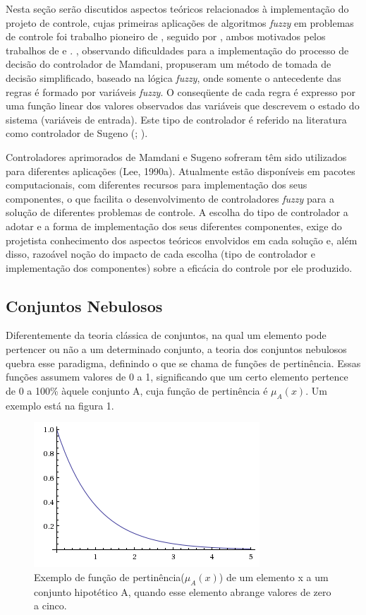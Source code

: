 \documentclass[
	twoside,				%
	twocolumn,				%
	english,				%
	brazil,					%
]{article}
\begin{document}
Nesta seção serão discutidos aspectos teóricos relacionados à implementação do projeto de controle, cujas primeiras aplicações de algoritmos \textit{fuzzy} em problemas de controle foi trabalho pioneiro de \cite{Mamdani:1973}, seguido por \cite{Sugeno:1985}, ambos motivados pelos trabalhos de \cite{Zadeh:1965} e \cite{Zadeh:1973}. \cite{TakagiSugeno:1983}, observando dificuldades para a implementação do processo de decisão do controlador de Mamdani, propuseram um método de tomada de decisão simplificado, baseado na lógica \textit{fuzzy}, onde somente o antecedente das regras é formado por variáveis \textit{fuzzy}. O conseqüente de cada regra é expresso por uma função linear dos valores observados das variáveis que descrevem o estado do sistema (variáveis de entrada). Este tipo de controlador é referido na literatura como controlador de Sugeno (\cite{Lee:1990}; \cite{Zimmermann:1996}).

Controladores aprimorados de Mamdani e Sugeno sofreram têm sido utilizados para diferentes aplicações (Lee, 1990a). Atualmente estão disponíveis em pacotes computacionais, com diferentes recursos para implementação dos seus componentes, o que facilita o desenvolvimento de controladores \textit{fuzzy} para a solução de diferentes problemas de controle. A escolha do tipo de controlador a adotar e a forma de implementação dos seus diferentes componentes, exige do projetista conhecimento dos aspectos teóricos envolvidos em cada solução e, além disso, razoável noção do impacto de cada escolha (tipo de controlador e implementação dos componentes) sobre a eficácia do controle por ele produzido.

\subsection{Conjuntos Nebulosos}

Diferentemente da teoria clássica de conjuntos, na qual um elemento pode pertencer ou não a um determinado conjunto, a teoria dos conjuntos nebulosos quebra esse paradigma, definindo o que se chama de funções de pertinência. Essas funções assumem valores de 0 a 1, significando que um certo elemento pertence de 0 a 100\% àquele conjunto A, cuja função de pertinência é $\mu_A(x)$. Um exemplo está na figura 1.

\begin{figure}[!ht]
    \centering
    \includegraphics[scale=0.65]{fp-example.png}
    \caption { Exemplo de função de pertinência($\mu_A(x)$) de um elemento x a um conjunto hipotético A, quando esse elemento abrange valores de zero a cinco. }
\end{figure}
\end{document}
